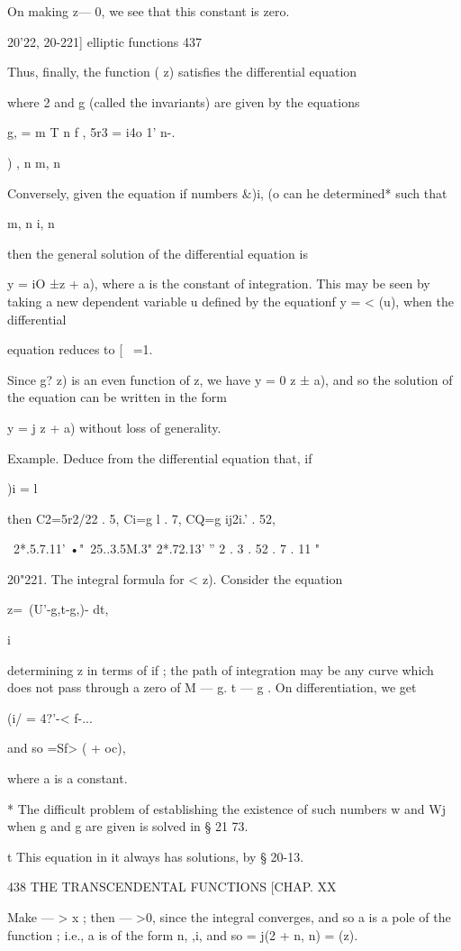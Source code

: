 {On making z— 0, we see that this constant is zero.

20'22, 20-221] elliptic functions 437

Thus, finally, the function ( z) satisfies the differential equation

where 2 and g (called the invariants) are given by the equations

g, = m T n f , 5r3 = i4o 1' n-.

) , n m, n

Conversely, given the equation if numbers \&)i, (o can he determined*
such that

m, n i, n

then the general solution of the differential equation is

y = iO ±z + a), where a is the constant of integration. This may be
seen by taking a new dependent variable u defined by the equationf y =
< (u), when the differential

equation reduces to [ \ =1.

Since g? z) is an even function of z, we have y = 0 z ± a), and so the
solution of the equation can be written in the form

y = j z + a) without loss of generality.

Example. Deduce from the differential equation that, if

)i = l

then C2=5r2/22 . 5, Ci=g l . 7, CQ=g ij2i.' . 52,

 ~2*.5.7.11' •"~25..3.5M.3" 2*.72.13' '' 2 . 3 . 52 . 7 . 11 "

20"221. The integral formula for < z). Consider the equation

z=\ (U'-g,t-g,)- dt,

  i

determining z in terms of if ; the path of integration may be any
curve which does not pass through a zero of M — g. t — g . On
differentiation, we get

(i/ = 4?'-< f-...

and so =Sf> ( + oc),

where a is a constant.

* The difficult problem of establishing the existence of such numbers
w and Wj when g and g are given is solved in § 21 73.

t This equation in it always has solutions, by § 20-13.

438 THE TRANSCENDENTAL FUNCTIONS [CHAP. XX

Make — > x ; then — >0, since the integral converges, and so a is a
pole of the function ; i.e., a is of the form n, ,i, and so = j(2 + n,
n) = (z).

}
